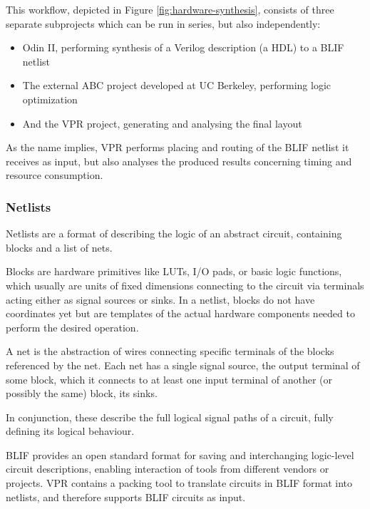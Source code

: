 This workflow, depicted in Figure \ref{fig:hardware-synthesis}, consists of three separate subprojects which can be run in series, but also independently: 

\begin{itemize}
	\item Odin II, performing synthesis of a Verilog description (a \gls{HDL}) to a \gls{BLIF} netlist
	\item The external ABC project developed at UC Berkeley\cite{ABC-web}, performing logic optimization
	\item And the \gls{VPR} project\cite{vpr-paper}, generating and analysing the final layout
\end{itemize}

As the name implies, \gls{VPR} performs placing and routing of the \gls{BLIF} netlist it receives as input, but also analyses the produced results concerning timing and resource consumption.

\subsubsection{Netlists}

Netlists are a format of describing the logic of an abstract circuit, containing blocks and a list of nets.

Blocks are hardware primitives like \glspl{LUT}, \gls{I/O} pads, or basic logic functions, which usually are units of fixed dimensions connecting to the circuit via terminals acting either as signal sources or sinks. In a netlist, blocks do not have coordinates yet but are templates of the actual hardware components needed to perform the desired operation.

A net is the abstraction of wires connecting specific terminals of the blocks referenced by the net. Each net has a single signal source, the output terminal of some block, which it connects to at least one input terminal of another (or possibly the same) block, its sinks.

In conjunction, these describe the full logical signal paths of a circuit, fully defining its logical behaviour.

\gls{BLIF} provides an open standard format for saving and interchanging logic-level circuit descriptions, enabling interaction of tools from different vendors or projects\cite{blif-web}. \gls{VPR} contains a packing tool to translate circuits in \gls{BLIF} format into netlists, and therefore supports \gls{BLIF} circuits as input.

